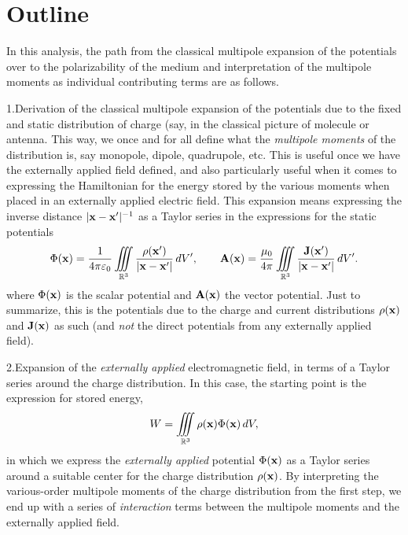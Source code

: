\def\date{December 26, 2022}
\def\author{Fredrik Jonsson}
\vskip24pt

\section{Outline}
In this analysis, the path from the classical multipole expansion of the
potentials over to the polarizability of the medium and interpretation of the
multipole moments as individual contributing terms are as follows.
\medskip
\item{1.}{Derivation of the classical multipole expansion of the potentials due
    to the fixed and static distribution of charge (say, in the classical
    picture of molecule or antenna. This way, we once and for all define what
    the {\it multipole moments} of the distribution is, say monopole, dipole,
    quadrupole, etc. This is useful once we have the externally applied field
    defined, and also particularly useful when it comes to expressing the
    Hamiltonian for the energy stored by the various moments when placed in an
    externally applied electric field. This expansion means expressing the
    inverse distance $|{\bf x}-{\bf x}'|^{-1}$ as a Taylor series in the
    expressions for the static potentials
    $$
      \Phi({\bf x})={{1}\over{4\pi\varepsilon_0}}
        \iiint_{{\Bbb R}^3}{{\rho({\bf x}')}\over{|{\bf x}-{\bf x}'|}}\,dV',
      \qquad
      {\bf A}({\bf x})={{\mu_0}\over{4\pi}}
        \iiint_{{\Bbb R}^3}{{{\bf J}({\bf x}')}\over{|{\bf x}-{\bf x}'|}}\,dV'.
    $$
    where $\Phi({\bf x})$ is the scalar potential and ${\bf A}({\bf x})$ the
    vector potential. Just to summarize, this is the potentials due to the
    charge and current distributions $\rho({\bf x})$ and ${\bf J}({\bf x})$
    as such (and {\it not} the direct potentials from any externally applied
    field).}
\item{2.}{Expansion of the {\it externally applied} electromagnetic field, in
    terms of a Taylor series around the charge distribution. In this case, the
    starting point is the expression for stored energy,
    $$
      W=\iiint_{{\Bbb R}^3}\rho({\bf x})\Phi({\bf x})\,dV,
    $$
    in which we express the {\it externally applied} potential $\Phi({\bf x})$
    as a Taylor series around a suitable center for the charge distribution
    $\rho({\bf x})$. By interpreting the various-order multipole moments of the
    charge distribution from the first step, we end up with a series of
    {\it interaction} terms between the multipole moments and the externally
    applied field.}
